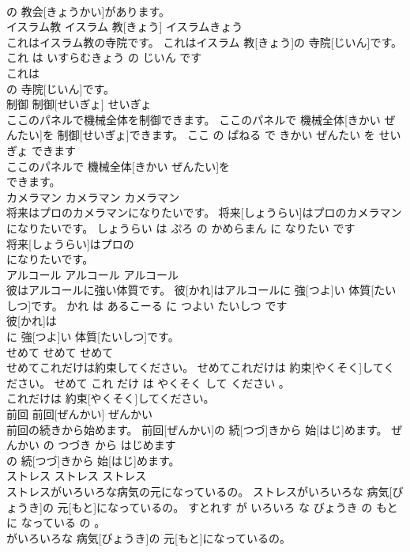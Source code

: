 \documentclass[8pt]{extreport}
\begin{document}
\begin{CJK}{UTF8}{min}
\\	の 教会[きょうかい]があります。			
\\	イスラム教	イスラム 教[きょう]	イスラムきょう	
\\	これはイスラム教の寺院です。	これはイスラム 教[きょう]の 寺院[じいん]です。	これ は いすらむきょう の じいん です	
\\	これは
\\	の 寺院[じいん]です。			
\\	制御	制御[せいぎょ]	せいぎょ	
\\	ここのパネルで機械全体を制御できます。	ここのパネルで 機械全体[きかい ぜんたい]を 制御[せいぎょ]できます。	ここ の ぱねる で きかい ぜんたい を せいぎょ できます	
\\	ここのパネルで 機械全体[きかい ぜんたい]を
\\	できます。			
\\	カメラマン	カメラマン	カメラマン	
\\	将来はプロのカメラマンになりたいです。	将来[しょうらい]はプロのカメラマンになりたいです。	しょうらい は ぷろ の かめらまん に なりたい です	
\\	将来[しょうらい]はプロの
\\	になりたいです。			
\\	アルコール	アルコール	アルコール	
\\	彼はアルコールに強い体質です。	彼[かれ]はアルコールに 強[つよ]い 体質[たいしつ]です。	かれ は あるこーる に つよい たいしつ です	
\\	彼[かれ]は
\\	に 強[つよ]い 体質[たいしつ]です。			
\\	せめて	せめて	せめて	
\\	せめてこれだけは約束してください。	せめてこれだけは 約束[やくそく]してください。	せめて これ だけ は やくそく して ください 。	
\\	これだけは 約束[やくそく]してください。			
\\	前回	前回[ぜんかい]	ぜんかい	
\\	前回の続きから始めます。	前回[ぜんかい]の 続[つづ]きから 始[はじ]めます。	ぜんかい の つづき から はじめます	
\\	の 続[つづ]きから 始[はじ]めます。			
\\	ストレス	ストレス	ストレス	
\\	ストレスがいろいろな病気の元になっているの。	ストレスがいろいろな 病気[びょうき]の 元[もと]になっているの。	すとれす が いろいろ な びょうき の もと に なっている の 。	
\\	がいろいろな 病気[びょうき]の 元[もと]になっているの。			

\end{CJK}
\end{document}
